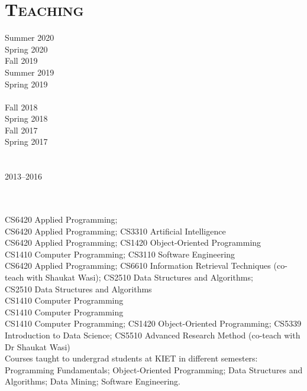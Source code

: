 \documentclass[a4paper, 10pt]{article}
\begin{document}
\section*{\normalfont\textsc{Teaching}}
\begin{minipage}{0.22\textwidth}
Summer 2020\textcolor{lightgray}{\dotfill}\\
Spring 2020\textcolor{lightgray}{\dotfill}\\
Fall 2019\textcolor{lightgray}{\dotfill}\\
Summer 2019\textcolor{lightgray}{\dotfill}\\
Spring 2019\textcolor{lightgray}{\dotfill}\\\\
Fall 2018\textcolor{lightgray}{\dotfill}\\
Spring 2018\textcolor{lightgray}{\dotfill}\\
Fall 2017\textcolor{lightgray}{\dotfill}\\
Spring 2017\textcolor{lightgray}{\dotfill}\\\\\\
2013--2016\textcolor{lightgray}{\dotfill}\\\\\\
\end{minipage}
\begin{minipage}{0.75\textwidth}
CS6420 Applied Programming;\\
CS6420 Applied Programming; CS3310 Artificial Intelligence\\
CS6420 Applied Programming; CS1420 Object-Oriented Programming\\
CS1410 Computer Programming; CS3110 Software Engineering\\
CS6420 Applied Programming; CS6610 Information Retrieval Techniques (co-teach with Shaukat Wasi); CS2510 Data Structures and Algorithms;\\
CS2510 Data Structures and Algorithms\\
CS1410 Computer Programming\\
CS1410 Computer Programming\\
CS1410 Computer Programming; CS1420 Object-Oriented Programming; CS5339 Introduction to Data Science; CS5510 Advanced Research Method (co-teach with Dr Shaukat Wasi)\\
Courses taught to undergrad students at KIET in different semesters: Programming Fundamentals; Object-Oriented Programming; Data Structures and Algorithms; Data Mining; Software Engineering.\\%
\end{minipage}
\end{document}

